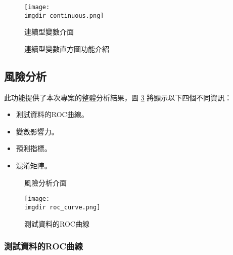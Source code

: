 \documentclass[12pt, a4paper]{article}
\begin{document}
\begin{figure}[H]
    \centering
        \texttt{[image: 
        \\imgdir continuous.png]}
     \caption{連續型變數介面}
    \label{fig: continuous}
\end{figure}


\begin{figure}[H]
	\centering
	
	
	
	
	\caption{連續型變數直方圖功能介紹}\label{fig:con_intro}
\end{figure}

\subsection{風險分析}
此功能提供了本次專案的整體分析結果，圖 \ref{fig:risk} 將顯示以下四個不同資訊：
	\begin{itemize}
		\item 測試資料的ROC曲線。
		\item 變數影響力。
		\item 預測指標。
		\item 混淆矩陣。
	\end{itemize}


\begin{figure}[h]
	\centering
	
	
	
	\caption{風險分析介面}\label{fig:risk}
\end{figure}



\begin{figure}[H]
    \centering
        \texttt{[image: 
        \\imgdir roc\_curve.png]}
     \caption{測試資料的ROC曲線}
    \label{fig: roc_curve}
\end{figure}
\subsubsection{測試資料的ROC曲線}
\end{document}
